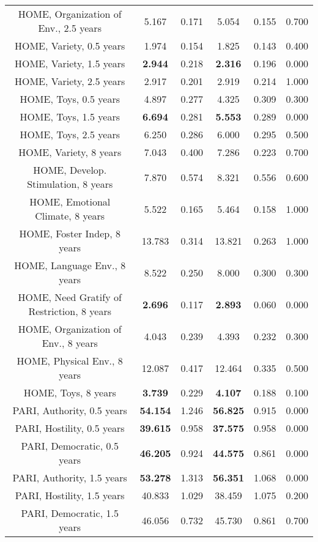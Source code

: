 \begin{longtable}{c c c c c c}
HOME, Organization of Env., 2.5 years & 5.167 & 0.171 &  5.054 & 0.155 & 0.700 \\
HOME, Variety, 0.5 years & 1.974 & 0.154 &  1.825 & 0.143 & 0.400 \\
HOME, Variety, 1.5 years & \textbf{2.944} & 0.218 &  \textbf{2.316} & 0.196 & 0.000 \\
HOME, Variety, 2.5 years & 2.917 & 0.201 &  2.919 & 0.214 & 1.000 \\
HOME, Toys, 0.5 years & 4.897 & 0.277 &  4.325 & 0.309 & 0.300 \\
HOME, Toys, 1.5 years & \textbf{6.694} & 0.281 &  \textbf{5.553} & 0.289 & 0.000 \\
HOME, Toys, 2.5 years & 6.250 & 0.286 &  6.000 & 0.295 & 0.500 \\
HOME, Variety, 8 years & 7.043 & 0.400 &  7.286 & 0.223 & 0.700 \\
HOME, Develop. Stimulation, 8 years & 7.870 & 0.574 &  8.321 & 0.556 & 0.600 \\
HOME, Emotional Climate, 8 years & 5.522 & 0.165 &  5.464 & 0.158 & 1.000 \\
HOME, Foster Indep, 8 years & 13.783 & 0.314 &  13.821 & 0.263 & 1.000 \\
HOME, Language Env., 8 years & 8.522 & 0.250 &  8.000 & 0.300 & 0.300 \\
HOME, Need Gratify of Restriction, 8 years & \textbf{2.696} & 0.117 &  \textbf{2.893} & 0.060 & 0.000 \\
HOME, Organization of Env., 8 years & 4.043 & 0.239 &  4.393 & 0.232 & 0.300 \\
HOME, Physical Env., 8 years & 12.087 & 0.417 &  12.464 & 0.335 & 0.500 \\
HOME, Toys, 8 years & \textbf{3.739} & 0.229 &  \textbf{4.107} & 0.188 & 0.100 \\
PARI, Authority, 0.5 years & \textbf{54.154} & 1.246 &  \textbf{56.825} & 0.915 & 0.000 \\
PARI, Hostility, 0.5 years & \textbf{39.615} & 0.958 &  \textbf{37.575} & 0.958 & 0.000 \\
PARI, Democratic, 0.5 years & \textbf{46.205} & 0.924 &  \textbf{44.575} & 0.861 & 0.000 \\
PARI, Authority, 1.5 years & \textbf{53.278} & 1.313 &  \textbf{56.351} & 1.068 & 0.000 \\
PARI, Hostility, 1.5 years & 40.833 & 1.029 &  38.459 & 1.075 & 0.200 \\
PARI, Democratic, 1.5 years & 46.056 & 0.732 &  45.730 & 0.861 & 0.700 \\
\bottomrule
\end{longtable}
